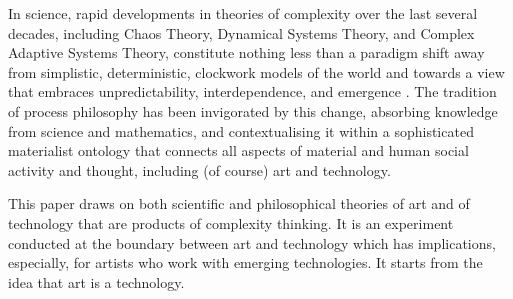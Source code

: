 \documentclass[letterpaper]{article}
\begin{document}
    In science, rapid developments in theories of complexity over the last several decades, including Chaos Theory, Dynamical Systems Theory, and Complex Adaptive Systems Theory, constitute nothing less than a paradigm shift away from simplistic, deterministic, clockwork models of the world and towards a view that embraces unpredictability, interdependence, and emergence \citep{StengersOrdrOtOfChs1984}. The tradition of process philosophy has been invigorated by this change, absorbing knowledge from science and mathematics, and contextualising it within a sophisticated materialist ontology that connects all aspects of material and human social activity and thought, including (of course) art and technology.
    
    This paper draws on both scientific and philosophical theories of art and of technology that are products of complexity thinking. It is an experiment conducted at the boundary between art and technology which has implications, especially, for artists who work with emerging technologies. It starts from the idea that art is a technology.
\end{document}
